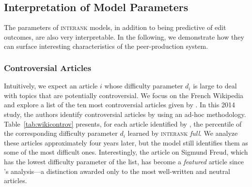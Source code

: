 \documentclass[format=sigconf]{acmart}
\begin{document}
\subsection{Interpretation of Model Parameters}

The parameters of \textsc{interank} models, in addition to being predictive of edit outcomes, are also very interpretable.
In the following, we demonstrate how they can surface interesting characteristics of the peer-production system.

\subsubsection{Controversial Articles}
Intuitively, we expect an article $i$ whose difficulty parameter $d_i$ is large to deal with topics that are potentially controversial.
We focus on the French Wikipedia and explore a list of the ten most controversial articles given by \citet{yasseri2014most}.
In this 2014 study, the authors identify controversial articles by using an ad-hoc methodology.
Table~\ref{tab:wikicontrov} presents, for each article identified by \citeauthor{yasseri2014most}, the percentile of the corresponding difficulty parameter $d_i$ learned by \textsc{interank} \emph{full}.
We analyze these articles approximately four years later, but the model still identifies them as some of the most difficult ones.
Interestingly, the article on Sigmund Freud, which has the lowest difficulty parameter of the list, has become a \emph{featured} article since \citeauthor{yasseri2014most}'s analysis---a distinction awarded only to the most well-written and neutral articles.
\end{document}
